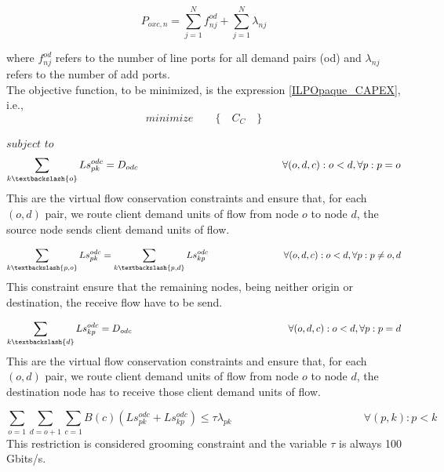\begin{equation}
P_{oxc,n} = \sum_{j=1}^{N} f_{nj}^{od} + \sum_{j=1}^{N} \lambda_{nj}
\label{OXC_poxc_transluc}
\end{equation}

\vspace{11pt}
\noindent
where $f_{nj}^{od}$ refers to the number of line ports for all demand pairs (od) and $\lambda_{nj}$ refers to the number of add ports.\\

The objective function, to be minimized, is the expression \ref{ILPOpaque_CAPEX}, i.e.,
\begin{equation*}
  minimize \qquad \Big\{ \quad C_C \quad \Big\}
\end{equation*}

$subject$ $to$
\begin{equation}
\sum_{k\textbackslash \{o\}} Ls_{pk}^{odc} = D_{odc} \qquad \qquad \qquad \qquad \qquad \qquad \qquad
\forall(o,d,c) : o < d, \forall p: p = o
\label{ILPTransluc1}
\end{equation}
\noindent
This are the virtual flow conservation constraints and ensure that, for each $(o,d)$ pair, we route client demand units of flow from node $o$ to node $d$, the source node sends client demand units of flow.

\begin{equation}
\sum_{k\textbackslash \{p,o\}} Ls_{pk}^{odc} = \sum_{k\textbackslash \{p,d\}} Ls_{kp}^{odc} \qquad \qquad \qquad \qquad
\forall(o,d,c) : o < d, \forall p: p \neq o,d
\label{ILPTransluc2}
\end{equation}
\noindent
This constraint ensure that the remaining nodes, being neither origin or destination, the receive flow have to be send.

\begin{equation}
\sum_{k\textbackslash \{d\}} Ls_{kp}^{odc} = D_{odc} \qquad \qquad \qquad \qquad \qquad \qquad \qquad \qquad
\forall(o,d,c) : o < d, \forall p: p = d
\label{ILPTransluc3}
\end{equation}
\noindent
This are the virtual flow conservation constraints and ensure that, for each $(o,d)$ pair, we route client demand units of flow from node $o$ to node $d$, the destination node has to receive those client demand units of flow.

\begin{equation}
\sum_{o=1} \sum_{d=o+1} \sum_{c=1} B(c)(Ls_{pk}^{odc} + Ls_{kp}^{odc}) \leq  \tau \lambda_{pk} \qquad \qquad \qquad \qquad \qquad \qquad
\forall (p,k) : p < k
\label{ILPTransluc4}
\end{equation}
\noindent
This restriction is considered grooming constraint and the variable $\tau$ is always 100 Gbits/s.

